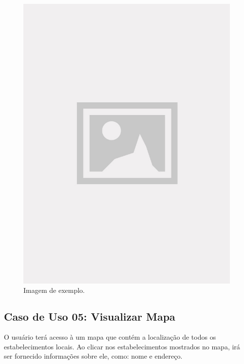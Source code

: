 \begin{figure}[!htb]
\centering
\caption{Imagem de exemplo.}
\includegraphics[width=\linewidth]{figuras/placeholder.jpg}
\end{figure}

\subsection{Caso de Uso 05: Visualizar Mapa}

O usuário terá acesso à um mapa que contém a localização de todos os estabelecimentos locais. Ao clicar nos estabelecimentos mostrados no mapa, irá ser fornecido informações sobre ele, como: nome e endereço.

